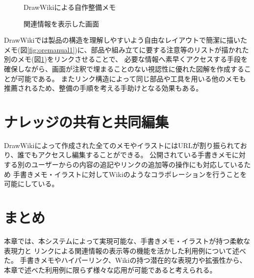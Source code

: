 \begin{figure}[H] \begin{minipage}{0.5\hsize}
                      \begin{center} 
                      \end{center} \caption{DrawWikiによる自作整備メモ} \label{fig:oremanual1}
\end{minipage} \begin{minipage}{0.5\hsize}
                   \begin{center} 
                   \end{center} \caption{関連情報を表示した画面} \label{fig:oremanual2}
\end{minipage}
\end{figure}

DrawWikiでは製品の構造を理解しやすいよう自由なレイアウトで簡潔に描いたメモ(図\ref{fig:oremanual1})に、部品や組み立てに要する注意等のリストが描かれた
別のメモ(図\ref{fig:oremanual2})をリンクさせることで、
必要な情報へ素早くアクセスする手段を確保しながら、画面が注釈で埋まることのない視認性に優れた図解を作成することが可能である。
またリンク構造によって同じ部品や工具を用いる他のメモも推薦されるため、整備の手順を考える手助けとなる効果もある。

\section{ナレッジの共有と共同編集}
DrawWikiによって作成された全てのメモやイラストにはURLが割り振られており、誰でもアクセスし編集することができる。
公開されている手書きメモに対する別のユーザーからの内容の追記やリンクの追加等の操作にも対応しているため
手書きメモ・イラストに対してWikiのようなコラボレーションを行うことを可能にしている。

\section{まとめ}
本章では、本システムによって実現可能な、手書きメモ・イラストが持つ柔軟な表現力と
リンクによる関連情報の表示等の機能を活かした利用例について述べた。
手書きメモやハイパーリンク、Wikiの持つ潜在的な表現力や拡張性から、本章で述べた利用例に限らず様々な応用が可能であると考えられる。
